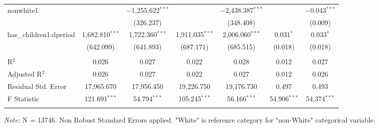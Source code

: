 \documentclass[a4paper]{article}
\begin{document}
\begin{table}[!htbp]
\begin{adjustwidth}{0.cm}{-0cm}
\begin{threeparttable}
\begin{tabular}{@{\extracolsep{-2pt}}lcccccc}
  nonwhite1 &  & $-$1,255.622$^{***}$ &  & $-$2,438.387$^{***}$ &  & $-$0.043$^{***}$ \\ 
  &  & (326.237) &  & (348.408) &  & (0.009) \\ 
  has\_children1:dperiod & 1,682.810$^{***}$ & 1,722.360$^{***}$ & 1,911.035$^{***}$ & 2,006.060$^{***}$ & 0.031$^{*}$ & 0.033$^{*}$ \\ 
  & (642.099) & (641.893) & (687.171) & (685.515) & (0.018) & (0.018) \\ 
 \hline \\[-1.8ex] 
R$^{2}$ & 0.026 & 0.027 & 0.022 & 0.028 & 0.012 & 0.027 \\ 
Adjusted R$^{2}$ & 0.026 & 0.027 & 0.022 & 0.027 & 0.012 & 0.026 \\ 
Residual Std. Error & 17,965.670 & 17,956.450  & 19,226.750  & 19,176.730 & 0.497  & 0.493  \\ 
F Statistic & 121.691$^{***}$ & 54.794$^{***}$ & 105.245$^{***}$ & 56.166$^{***}$  & 54.906$^{***}$  & 54.374$^{***}$  \\ 
\hline 
\hline \\[-3.5ex] 
\end{tabular} 
\begin{tablenotes}
      \small
      \item\textit{Note:} N = 13746. Non Robust Standard Errors applied. "White" is reference category for "non-White" categorical variable.
    \end{tablenotes}
\end{threeparttable}
\end{adjustwidth}
%
\end{table}
\end{document}
